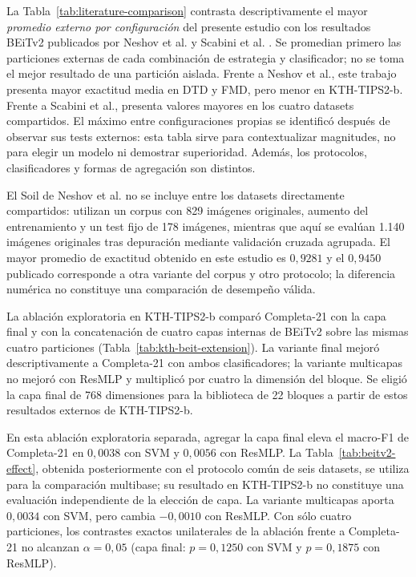 \documentclass[a4paper,fleqn]{cas-sc}
\begin{document}


La Tabla~\ref{tab:literature-comparison} contrasta descriptivamente el mayor \emph{promedio externo por configuración} del presente estudio con los resultados BEiTv2 publicados por Neshov et al. \citep{neshov2025aggregation} y Scabini et al. \citep{scabini2025survey}. Se promedian primero las particiones externas de cada combinación de estrategia y clasificador; no se toma el mejor resultado de una partición aislada. Frente a Neshov et al., este trabajo presenta mayor exactitud media en DTD y FMD, pero menor en KTH-TIPS2-b. Frente a Scabini et al., presenta valores mayores en los cuatro datasets compartidos. El máximo entre configuraciones propias se identificó después de observar sus tests externos: esta tabla sirve para contextualizar magnitudes, no para elegir un modelo ni demostrar superioridad. Además, los protocolos, clasificadores y formas de agregación son distintos.

El Soil de Neshov et al. no se incluye entre los datasets directamente compartidos: utilizan un corpus con 829 imágenes originales, aumento del entrenamiento y un test fijo de 178 imágenes, mientras que aquí se evalúan 1.140 imágenes originales tras depuración mediante validación cruzada agrupada. El mayor promedio de exactitud obtenido en este estudio es $0{,}9281$ y el $0{,}9450$ publicado corresponde a otra variante del corpus y otro protocolo; la diferencia numérica no constituye una comparación de desempeño válida.



La ablación exploratoria en KTH-TIPS2-b comparó Completa-21 con la capa final y con la concatenación de cuatro capas internas de BEiTv2 sobre las mismas cuatro particiones (Tabla~\ref{tab:kth-beit-extension}). La variante final mejoró descriptivamente a Completa-21 con ambos clasificadores; la variante multicapas no mejoró con ResMLP y multiplicó por cuatro la dimensión del bloque. Se eligió la capa final de 768 dimensiones para la biblioteca de 22 bloques a partir de estos resultados externos de KTH-TIPS2-b.



En esta ablación exploratoria separada, agregar la capa final eleva el macro-F1 de Completa-21 en $0{,}0038$ con SVM y $0{,}0056$ con ResMLP. La Tabla~\ref{tab:beitv2-effect}, obtenida posteriormente con el protocolo común de seis datasets, se utiliza para la comparación multibase; su resultado en KTH-TIPS2-b no constituye una evaluación independiente de la elección de capa. La variante multicapas aporta $0{,}0034$ con SVM, pero cambia $-0{,}0010$ con ResMLP. Con sólo cuatro particiones, los contrastes exactos unilaterales de la ablación frente a Completa-21 no alcanzan $\alpha=0{,}05$ (capa final: $p=0{,}1250$ con SVM y $p=0{,}1875$ con ResMLP).
\end{document}

